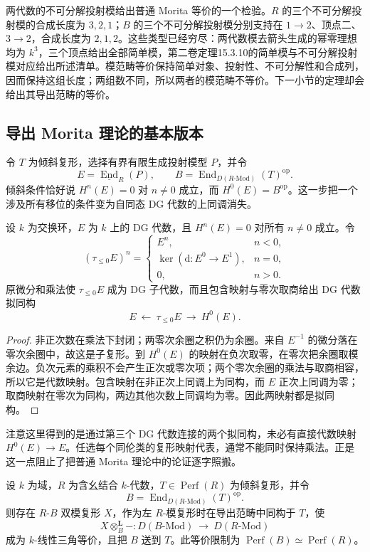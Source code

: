 两代数的不可分解投射模给出普通 Morita 等价的一个检验。\(R\) 的三个不可分解投射模的合成长度为 \(3,2,1\)；\(B\) 的三个不可分解投射模分别支持在 \(1\to2\)、顶点二、\(3\to2\)，合成长度为 \(2,1,2\)。这些类型已经穷尽：两代数模去箭头生成的幂零理想均为 \(k^3\)，三个顶点给出全部简单模，第二卷定理15.3.10的简单模与不可分解投射模对应给出所述清单。模范畴等价保持简单对象、投射性、不可分解性和合成列，因而保持这组长度；两组数不同，所以两者的模范畴不等价。下一小节的定理却会给出其导出范畴的等价。

\subsection{导出 Morita 理论的基本版本}
\label{b4:subsec:2003:03}

令 \(T\) 为倾斜复形，选择有界有限生成投射模型 \(P\)，并令
\[
	E=\underline{\operatorname{End}}_R(P),\qquad B=\operatorname{End}_{D(R\text{-}\mathrm{Mod})}(T)^{\mathrm{op}}.
\]
倾斜条件恰好说 \(H^n(E)=0\) 对 \(n\ne0\) 成立，而 \(H^0(E)=B^{\mathrm{op}}\)。这一步把一个涉及所有移位的条件变为自同态 DG 代数的上同调消失。

\begin{proposition}\label{b4:prop:dg-degree-zero-formality}
	设 \(k\) 为交换环，\(E\) 为 \(k\) 上的 DG 代数，且 \(H^n(E)=0\) 对所有 \(n\ne0\) 成立。令
	\[
		(\tau_{\le0}E)^n=
		\begin{cases}
			E^n,&n<0,\\
			\ker(\mathrm{d}:E^0\to E^1),&n=0,\\
			0,&n>0.
		\end{cases}
	\]
	原微分和乘法使 \(\tau_{\le0}E\) 成为 DG 子代数，而且包含映射与零次取商给出 DG 代数拟同构
	\[
		E\ \longleftarrow\ \tau_{\le0}E\ \longrightarrow\ H^0(E).
	\]
\end{proposition}
\begin{proof}
	非正次数在乘法下封闭；两零次余圈之积仍为余圈。来自 \(E^{-1}\) 的微分落在零次余圈中，故这是子复形。到 \(H^0(E)\) 的映射在负次取零，在零次把余圈取模余边。负次元素的乘积不会产生正次或零次项；两个零次余圈的乘法与取商相容，所以它是代数映射。包含映射在非正次上同调上为同构，而 \(E\) 正次上同调为零；取商映射在零次为同构，两边其他次数上同调均为零。因此两映射都是拟同构。
\end{proof}

注意这里得到的是通过第三个 DG 代数连接的两个拟同构，未必有直接代数映射 \(H^0(E)\to E\)。任选每个同伦类的复形映射代表，通常不能同时保持乘法。正是这一点阻止了把普通 Morita 理论中的论证逐字照搬。

\begin{theorem}\label{b4:thm:derived-morita-tilting}
	设 \(k\) 为域，\(R\) 为含幺结合 \(k\)-代数，\(T\in\operatorname{Perf}(R)\) 为倾斜复形，并令
	\[
		B=\operatorname{End}_{D(R\text{-}\mathrm{Mod})}(T)^{\mathrm{op}}.
	\]
	则存在 \(R\)-\(B\) 双模复形 \(X\)，作为左 \(R\)-模复形时在导出范畴中同构于 \(T\)，使
	\[
		X\otimes_B^{\mathbf L}-: D(B\text{-}\mathrm{Mod})\ \longrightarrow\ D(R\text{-}\mathrm{Mod})
	\]
	成为 \(k\)-线性三角等价，且把 \(B\) 送到 \(T\)。此等价限制为 \(\operatorname{Perf}(B)\simeq\operatorname{Perf}(R)\)。
\end{theorem}

